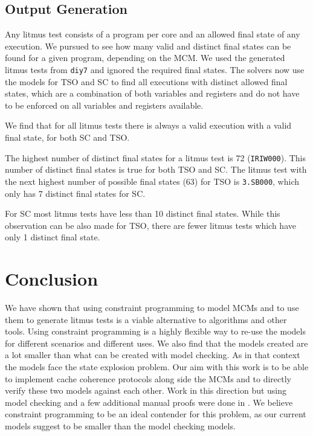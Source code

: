 \documentclass[runningheads]{llncs}
\begin{document}
\subsection{Output Generation}
Any litmus test consists of a program per core and an allowed final state of any execution.
We pursued to see how many valid and distinct final states can be found for a given program, depending on the MCM.
We used the generated litmus tests from {\tt{diy7}} and ignored the required final states.
The solvers now use the models for TSO and SC to find all executions with distinct allowed final states, which are a combination of both variables and registers and do not have to be enforced on all variables and registers available.

We find that for all litmus tests there is always a valid execution with a valid final state, for both SC and TSO.

The highest number of distinct final states for a litmus test is 72 ({\tt{IRIW000}}).
This number of distinct final states is true for both TSO and SC.
The litmus test with the next highest number of possible final states (63) for TSO is {\tt{3.SB000}}, which only has 7 distinct final states for SC.

For SC most litmus tests have less than 10 distinct final states.
While this observation can be also made for TSO, there are fewer litmus tests which have only 1 distinct final state.

\section{Conclusion}
We have shown that using constraint programming to model MCMs and to use them to generate litmus tests is a viable alternative to algorithms and other tools.
Using constraint programming is a highly flexible way to re-use the models for different scenarios and different uses.
We also find that the models created are a lot smaller than what can be created with model checking. As in that context the models face the state explosion problem.
Our aim with this work is to be able to implement cache coherence protocols along side the MCMs and to directly verify these two models against each other.
Work in this direction but using model checking and a few additional manual proofs were done in \cite{banks2017verification}.
We believe constraint programming to be an ideal contender for this problem, as our current models suggest to be smaller than the model checking models.



\end{document}
